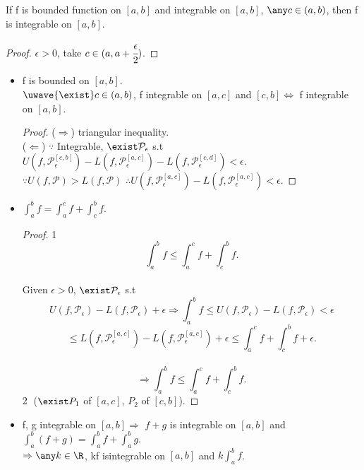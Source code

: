 \begin{theorem}
    If f is bounded function on $[a,b]$ and integrable on $[a,b]$, $\any c \in (a,b)$, then f is integrable on $[a,b]$. 
\end{theorem}
\begin{proof}
    $\epsilon > 0$, take $c \in (a, a+ \cfrac{\epsilon}{2})$.
\end{proof}
\begin{property}
\begin{itemize}
    \item f is bounded on $[a,b]$. \\
    $\uwave{\exist} c \in (a,b)$, f integrable on $[a,c]$ and $[c,b] \Leftrightarrow$ f integrable on $[a,b]$. \\
    \begin{proof}
        ($\Rightarrow$) triangular inequality. \\
        ($\Leftarrow$) $\because$ Integrable, $\exist \mathcal{P}_\epsilon$ s.t $U(f,\mathcal{P}_\epsilon^{[c,b]}) - L (f, \mathcal{P}_\epsilon^{[a,c]}) - L (f, \mathcal{P}_\epsilon^{[c,d]}) < \epsilon$. \\
        $\because U(f, \mathcal{P}) > L(f, \mathcal{P})$ $\therefore U(f,\mathcal{P}_\epsilon^{[a,c]}) - L(f,\mathcal{P}_\epsilon^{[a,c]}) < \epsilon$.
    \end{proof}
    \item $\int^b_a f = \int^c_a f + \int^b_c f.$ \\
    \begin{proof}
        \textcircled{1} \[
        \int_a^b f \leq \int^c_a f + \int^b_c f.
        \] \\
        Given $\epsilon >0$, $\exist \mathcal{P}_\epsilon$ s.t \[
        U(f, \mathcal{P}_\epsilon) - L(f, \mathcal{P}_\epsilon) + \epsilon \Rightarrow 
        \int^b_a f \leq U(f, \mathcal{P}_\epsilon) - L(f, \mathcal{P}_\epsilon) < \epsilon \]\[ \leq L(f,\mathcal{P}_\epsilon^{[a,c]}) - L(f,\mathcal{P}_\epsilon^{[a,c]}) + \epsilon \leq \int^c_a f + \int^b_c f + \epsilon. 
        \] \\
        \[ \Rightarrow
        \int_a^b f \leq \int^c_a f + \int^b_c f.\]
        \textcircled{2} ($\exist P_1$ of $[a,c]$, $P_2$ of $[c,b]$).
    \end{proof}
    \item f, g integrable on $[a,b] \Rightarrow$ $f+g$ is integrable on $[a,b]$ and $\int_a^b (f+g) = \int_a^b f + \int_a^b g$. \\
    $\Rightarrow \any k \in \R$, kf isintegrable on $[a,b]$ and $k\int_a^b f$.
\end{itemize}
\end{property}
